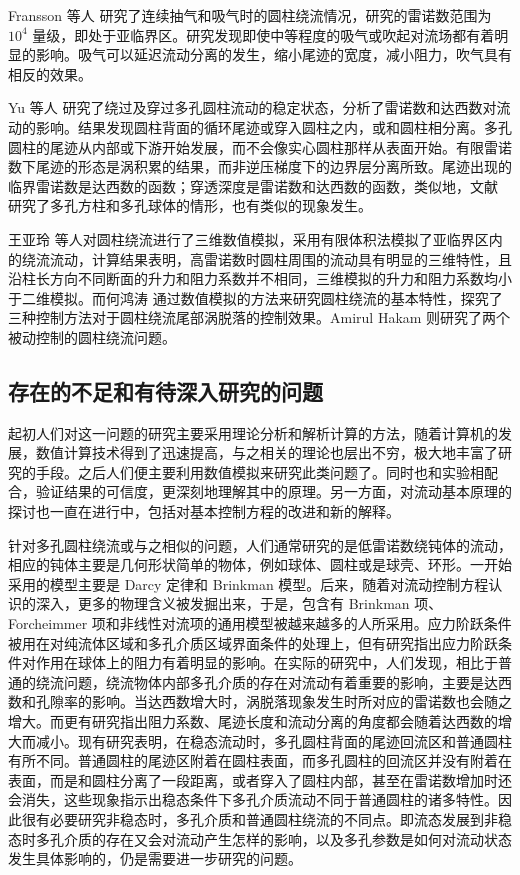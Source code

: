 Fransson 等人 \cite{fransson2004flow} 研究了连续抽气和吸气时的圆柱绕流情况，研究的雷诺数范围为 $10^4$ 量级，即处于亚临界区。研究发现即使中等程度的吸气或吹起对流场都有着明显的影响。吸气可以延迟流动分离的发生，缩小尾迹的宽度，减小阻力，吹气具有相反的效果。

Yu 等人 \cite{Yu2011} 研究了绕过及穿过多孔圆柱流动的稳定状态，分析了雷诺数和达西数对流动的影响。结果发现圆柱背面的循环尾迹或穿入圆柱之内，或和圆柱相分离。多孔圆柱的尾迹从内部或下游开始发展，而不会像实心圆柱那样从表面开始。有限雷诺数下尾迹的形态是涡积累的结果，而非逆压梯度下的边界层分离所致。尾迹出现的临界雷诺数是达西数的函数；穿透深度是雷诺数和达西数的函数，类似地，文献  研究了多孔方柱和多孔球体的情形，也有类似的现象发生。

王亚玲 \cite{王亚玲2001圆柱绕流的三维数值模拟} 等人对圆柱绕流进行了三维数值模拟，采用有限体积法模拟了亚临界区内的绕流流动，计算结果表明，高雷诺数时圆柱周围的流动具有明显的三维特性，且沿柱长方向不同断面的升力和阻力系数并不相同，三维模拟的升力和阻力系数均小于二维模拟。而何鸿涛 \cite{何鸿涛2009圆柱绕流及其控制的数值模拟研究} 通过数值模拟的方法来研究圆柱绕流的基本特性，探究了三种控制方法对于圆柱绕流尾部涡脱落的控制效果。Amirul Hakam\cite{Hakam2018} 则研究了两个被动控制的圆柱绕流问题。

\subsection{存在的不足和有待深入研究的问题}

起初人们对这一问题的研究主要采用理论分析和解析计算的方法，随着计算机的发展，数值计算技术得到了迅速提高，与之相关的理论也层出不穷，极大地丰富了研究的手段。之后人们便主要利用数值模拟来研究此类问题了。同时也和实验相配合，验证结果的可信度，更深刻地理解其中的原理。另一方面，对流动基本原理的探讨也一直在进行中，包括对基本控制方程的改进和新的解释。

针对多孔圆柱绕流或与之相似的问题，人们通常研究的是低雷诺数绕钝体的流动，相应的钝体主要是几何形状简单的物体，例如球体、圆柱或是球壳、环形。一开始采用的模型主要是 Darcy 定律和 Brinkman 模型。后来，随着对流动控制方程认识的深入，更多的物理含义被发掘出来，于是，包含有 Brinkman 项、Forcheimmer 项和非线性对流项的通用模型被越来越多的人所采用。应力阶跃条件被用在对纯流体区域和多孔介质区域界面条件的处理上，但有研究指出应力阶跃条件对作用在球体上的阻力有着明显的影响。在实际的研究中，人们发现，相比于普通的绕流问题，绕流物体内部多孔介质的存在对流动有着重要的影响，主要是达西数和孔隙率的影响。当达西数增大时，涡脱落现象发生时所对应的雷诺数也会随之增大。而更有研究指出阻力系数、尾迹长度和流动分离的角度都会随着达西数的增大而减小。现有研究表明，在稳态流动时，多孔圆柱背面的尾迹回流区和普通圆柱有所不同。普通圆柱的尾迹区附着在圆柱表面，而多孔圆柱的回流区并没有附着在表面，而是和圆柱分离了一段距离，或者穿入了圆柱内部，甚至在雷诺数增加时还会消失，这些现象指示出稳态条件下多孔介质流动不同于普通圆柱的诸多特性。因此很有必要研究非稳态时，多孔介质和普通圆柱绕流的不同点。即流态发展到非稳态时多孔介质的存在又会对流动产生怎样的影响，以及多孔参数是如何对流动状态发生具体影响的，仍是需要进一步研究的问题。

